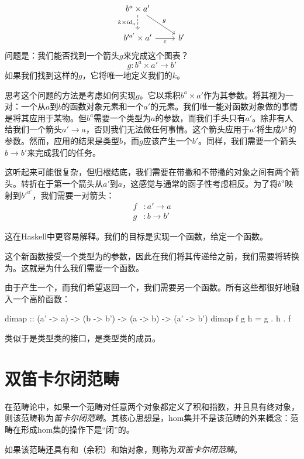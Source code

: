 \documentclass[DaoFP]{subfiles}
\begin{document}
\[
 \begin{tikzcd}
 b^a \times a'
 \arrow[d, dashed, "k \times id_a"']
 \arrow[rd, "g"]
 \\
 b'^{a'} \times a'
 \arrow[r, "\varepsilon"']
& b'
 \end{tikzcd}
\]
问题是：我们能否找到一个箭头$g$来完成这个图表？
\[g \colon b^a \times a' \to b'\]
如果我们找到这样的$g$，它将唯一地定义我们的$k$。

思考这个问题的方法是考虑如何实现$g$。它以乘积$b^a \times a'$作为其参数。将其视为一对：一个从$a$到$b$的函数对象元素和一个$a'$的元素。我们唯一能对函数对象做的事情是将其应用于某物。但$b^a$需要一个类型为$a$的参数，而我们手头只有$a'$。除非有人给我们一个箭头$a' \to a$，否则我们无法做任何事情。这个箭头应用于$a'$将生成$b^a$的参数。然而，应用的结果是类型$b$，而$g$应该产生一个$b'$。同样，我们需要一个箭头$b \to b'$来完成我们的任务。

这听起来可能很复杂，但归根结底，我们需要在带撇和不带撇的对象之间有两个箭头。转折在于第一个箭头从$a'$到$a$，这感觉与通常的函子性考虑相反。为了将$b^a$映射到$b'^{a'}$，我们需要一对箭头：
\begin{align*}
f &\colon a' \to a \\
g &\colon b \to b' 
\end{align*}

这在Haskell中更容易解释。我们的目标是实现一个函数，给定一个函数。

这个新函数接受一个类型为的参数，因此在我们将其传递给之前，我们需要将转换为。这就是为什么我们需要一个函数。

由于产生一个，而我们希望返回一个，我们需要另一个函数。所有这些都很好地融入一个高阶函数：
\begin{haskell}
dimap :: (a' -> a) -> (b -> b') -> (a -> b) -> (a' -> b')
dimap f g h = g . h . f
\end{haskell}
类似于是类型类的接口，是类型类的成员。

\section{双笛卡尔闭范畴}

在范畴论中，如果一个范畴对任意两个对象都定义了积和指数，并且具有终对象，则该范畴称为\emph{笛卡尔闭范畴}。其核心思想是，hom集并不是该范畴的外来概念：范畴在形成hom集的操作下是“闭”的。

如果该范畴还具有和（余积）和始对象，则称为\emph{双笛卡尔闭范畴}。
\end{document}

